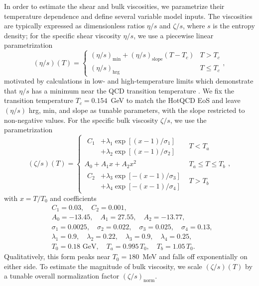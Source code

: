 \documentclass[aps,prc,reprint,amsmath,nofootinbib,noeprint]{revtex4-1}
\begin{document}
In order to estimate the shear and bulk viscosities, we parametrize their temperature dependence and define several variable model inputs.
The viscosities are typically expressed as dimensionless ratios $\eta/s$ and $\zeta/s$, where $s$ is the entropy density;
for the specific shear viscosity $\eta/s$, we use a piecewise linear parametrization
\begin{equation}
  (\eta/s)(T) =
  \begin{cases}
    (\eta/s)_\text{min} + (\eta/s)_\text{slope} (T - T_c) & T > T_c \\
    (\eta/s)_\text{hrg}                                   & T \le T_c
  \end{cases},
  \label{eq:etas}
\end{equation}
motivated by calculations in low- and high-temperature limits which demonstrate that $\eta/s$ has a minimum near the QCD transition temperature \cite{Prakash:1993bt, Arnold:2003zc, Csernai:2006zz}.
We fix the transition temperature $T_c = 0.154$~GeV to match the HotQCD EoS \cite{Bazavov:2014pvz} and leave $(\eta/s)$ hrg, min, and slope as tunable parameters, with the slope restricted to non-negative values.
For the specific bulk viscosity $\zeta/s$, we use the parametrization \cite{Denicol:2009am, Ryu:2015vwa}
\begin{equation}
  (\zeta/s)(T) =
  \begin{cases}
    \begin{aligned}
      C_1 &+ \lambda_1 \exp [(x-1)/\sigma_1]  \\ &+ \lambda_2 \exp [ (x-1)/\sigma_2]
    \end{aligned}
    &T < T_a \\[3ex]
    A_0 + A_1 x + A_2 x^2 &T_a \le T \le T_b \\[2ex]
    \begin{aligned}
      C_2 &+ \lambda_3 \exp [-(x-1)/\sigma_3]  \\ &+ \lambda_4 \exp [-(x-1)/\sigma_4]
    \end{aligned}
    &T > T_b
  \end{cases},
  \label{eq:zetas}
\end{equation}
with $x = T/T_0$ and coefficients
\begin{align*}
  &C_1=0.03,\quad C_2=0.001, \\
  &A_0=-13.45,\quad A_1=27.55,\quad A_2=-13.77, \\
  &\sigma_1=0.0025,\quad \sigma_2=0.022,\quad \sigma_3=0.025,\quad \sigma_4=0.13, \\
  &\lambda_1=0.9,\quad \lambda_2=0.22,\quad \lambda_3=0.9,\quad \lambda_4=0.25, \\
  &T_0 = 0.18 \text{ GeV},\quad T_a = 0.995\, T_0,\quad T_b = 1.05\, T_0.
\end{align*}
Qualitatively, this form peaks near $T_0 = 180$~MeV and falls off exponentially on either side.
To estimate the magnitude of bulk viscosity, we scale $(\zeta/s)(T)$ by a tunable overall normalization factor $(\zeta/s)_\text{norm}$.
\end{document}
